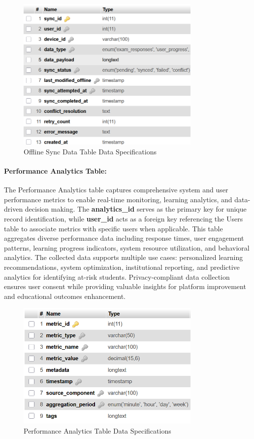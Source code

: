 \documentclass[12pt,a4paper,oneside]{book}
\begin{document}
\begin{figure}[H]
\centering
\includegraphics[width=0.8\textwidth]{assets/DBTable/Table4.10.png}
\caption{Offline Sync Data Table Data Specifications}
\label{table:offline_sync_data}
\end{figure}

\clearpage
\paragraph{Performance Analytics Table:}
The Performance Analytics table captures comprehensive system and user performance metrics to enable real-time monitoring, learning analytics, and data-driven decision making. The \textbf{analytics\_id} serves as the primary key for unique record identification, while \textbf{user\_id} acts as a foreign key referencing the Users table to associate metrics with specific users when applicable. This table aggregates diverse performance data including response times, user engagement patterns, learning progress indicators, system resource utilization, and behavioral analytics. The collected data supports multiple use cases: personalized learning recommendations, system optimization, institutional reporting, and predictive analytics for identifying at-risk students. Privacy-compliant data collection ensures user consent while providing valuable insights for platform improvement and educational outcomes enhancement.

\begin{figure}[H]
\centering
\includegraphics[width=0.8\textwidth]{assets/DBTable/Table4.11.png}
\caption{Performance Analytics Table Data Specifications}
\label{table:performance_analytics}
\end{figure}
\end{document}
